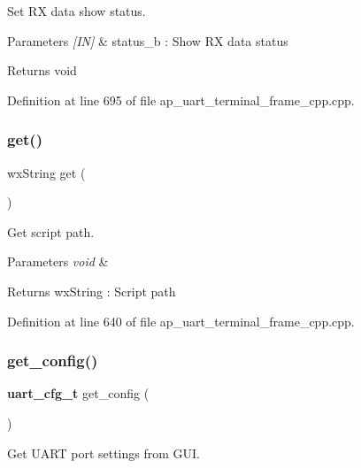 Set RX data show status. 


\begin{DoxyParams}{Parameters}
{\em \mbox{[}\+I\+N\mbox{]}} & status\+\_\+b \+: Show RX data status \\
\hline
\end{DoxyParams}
\begin{DoxyReturn}{Returns}
void 
\end{DoxyReturn}


Definition at line 695 of file ap\+\_\+uart\+\_\+terminal\+\_\+frame\+\_\+cpp.\+cpp.

\mbox{\label{group___u_a_r_t__terminal_gad833fe8055e535b4696cfc376a286f80}} 
\subsubsection{get()}
{\footnotesize\ttfamily wx\+String get (\begin{DoxyParamCaption}\item[{void}]{ }\end{DoxyParamCaption})}



Get script path. 


\begin{DoxyParams}{Parameters}
{\em void} & \\
\hline
\end{DoxyParams}
\begin{DoxyReturn}{Returns}
wx\+String \+: Script path 
\end{DoxyReturn}


Definition at line 640 of file ap\+\_\+uart\+\_\+terminal\+\_\+frame\+\_\+cpp.\+cpp.

\mbox{\label{group___u_a_r_t__terminal_gab5f10a8a2328c6ded33c452d6c0c8792}} 
\subsubsection{get\_config()}
{\footnotesize\ttfamily \textbf{ uart\+\_\+cfg\+\_\+t} get\+\_\+config (\begin{DoxyParamCaption}\item[{void}]{ }\end{DoxyParamCaption})}



Get U\+A\+RT port settings from G\+UI. 


